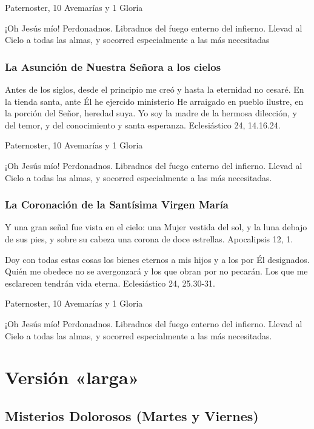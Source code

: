 \documentclass[a4paper,11pt, oneside]{report}
\begin{document}
         Paternoster, 10 Avemarías y 1 Gloria
        
        \medskip
        ¡Oh Jesús mío! Perdonadnos. Libradnos del fuego enterno del infierno. Llevad al Cielo a todas las almas, y socorred especialmente a las más 
        necesitadas

      \subsection*{La Asunción de Nuestra Señora a los cielos}
        Antes de los siglos, desde el principio me creó y hasta la eternidad no cesaré. En la tienda santa, ante Él he ejercido ministerio
        He arraigado en pueblo ilustre, en la porción del Señor, heredad suya. Yo soy la madre de la hermosa dilección, y del temor, y del
        conocimiento y santa esperanza. Eclesiástico 24, 14.16.24.

         Paternoster, 10 Avemarías y 1 Gloria
        
        \medskip
        ¡Oh Jesús mío! Perdonadnos. Libradnos del fuego enterno del infierno. Llevad al Cielo a todas las almas, y socorred especialmente a las más necesitadas.

      \subsection*{La Coronación de la Santísima Virgen María}
        Y una gran señal fue vista en el cielo: una Mujer vestida del sol, y la luna debajo de sus pies, y sobre su cabeza una corona de doce estrellas.
        Apocalipsis 12, 1.

        \medskip
        Doy con todas estas cosas los bienes eternos a mis hijos y a los por Él designados. Quién me obedece no se avergonzará y los que obran por
        no pecarán. Los que me esclarecen tendrán vida eterna. Eclesiástico 24, 25.30-31.

         Paternoster, 10 Avemarías y 1 Gloria
        
        \medskip
        ¡Oh Jesús mío! Perdonadnos. Libradnos del fuego enterno del infierno. Llevad al Cielo a todas las almas, y socorred especialmente a las más necesitadas.

  \chapter*{Versión «larga»}
        
    \section*{Misterios Dolorosos (Martes y Viernes)}
    
\end{document}
